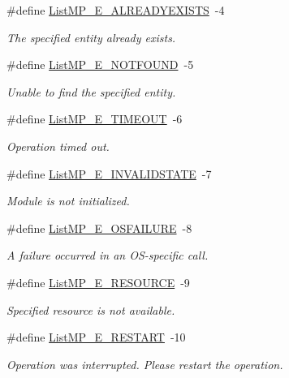 \begin{DoxyCompactItemize}
\#define \hyperlink{_list_m_p_8h_aa943a6dd86b5cd4092faa9a2c3650678}{ListMP\_\-E\_\-ALREADYEXISTS}~-\/4
\begin{DoxyCompactList}\small\item\em The specified entity already exists. \item\end{DoxyCompactList}\item 
\#define \hyperlink{_list_m_p_8h_ad1094272ac41cf2b022d6c514beaceac}{ListMP\_\-E\_\-NOTFOUND}~-\/5
\begin{DoxyCompactList}\small\item\em Unable to find the specified entity. \item\end{DoxyCompactList}\item 
\#define \hyperlink{_list_m_p_8h_a163b8195b54eab051c94c37b6f76a3c0}{ListMP\_\-E\_\-TIMEOUT}~-\/6
\begin{DoxyCompactList}\small\item\em Operation timed out. \item\end{DoxyCompactList}\item 
\#define \hyperlink{_list_m_p_8h_a1f5136445766b775f24f09fbc1e77531}{ListMP\_\-E\_\-INVALIDSTATE}~-\/7
\begin{DoxyCompactList}\small\item\em Module is not initialized. \item\end{DoxyCompactList}\item 
\#define \hyperlink{_list_m_p_8h_a71a0081f7de24109c2b91f209b3d9d3d}{ListMP\_\-E\_\-OSFAILURE}~-\/8
\begin{DoxyCompactList}\small\item\em A failure occurred in an OS-\/specific call. \item\end{DoxyCompactList}\item 
\#define \hyperlink{_list_m_p_8h_a17bd29505d65eb1130a9526bb842507c}{ListMP\_\-E\_\-RESOURCE}~-\/9
\begin{DoxyCompactList}\small\item\em Specified resource is not available. \item\end{DoxyCompactList}\item 
\#define \hyperlink{_list_m_p_8h_a6fd9b6b57f38d4be617d2fdae5f4d4e8}{ListMP\_\-E\_\-RESTART}~-\/10
\begin{DoxyCompactList}\small\item\em Operation was interrupted. Please restart the operation. \item\end{DoxyCompactList}\end{DoxyCompactItemize}
